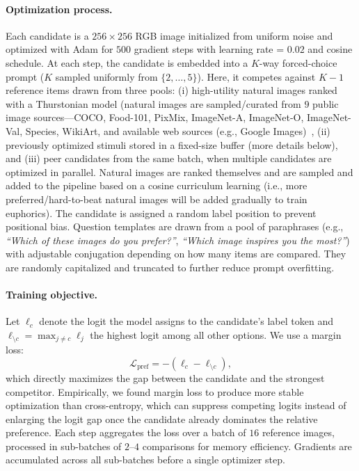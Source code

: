 \paragraph{Optimization process.}
Each candidate is a $256 \times 256$ RGB image initialized from uniform noise and optimized with Adam for $500$ gradient steps with learning rate = $0.02$ and cosine schedule. At each step, the candidate is embedded into a $K$-way forced-choice prompt ($K$ sampled uniformly from $\{2,\ldots,5\}$). Here, it competes against $K{-}1$ reference items drawn from three pools: (i) high-utility natural images ranked with a Thurstonian model (natural images are sampled/curated from $9$ public image sources---COCO, Food-101, PixMix, ImageNet-A, ImageNet-O, ImageNet-Val, Species, WikiArt, and available web sources (e.g., Google Images)~\citep{lin2014coco,bossard14,hendrycks2022pixmixdreamlikepicturescomprehensively,hendrycks2021nae,5206848,he2023species196,wikiart}, (ii) previously optimized stimuli stored in a fixed-size buffer (more details below), and (iii) peer candidates from the same batch, when multiple candidates are optimized in parallel. Natural images are ranked themselves and are sampled and added to the pipeline based on a cosine curriculum learning (i.e., more preferred/hard-to-beat natural images will be added gradually to train euphorics). The candidate is assigned a random label position to prevent positional bias. Question templates are drawn from a pool of paraphrases (e.g., \textit{``Which of these images do you prefer?''}, \textit{``Which image inspires you the most?''}) with adjustable conjugation depending on how many items are compared. They are randomly capitalized and truncated to further reduce prompt overfitting.

\paragraph{Training objective.}
Let $\ell_c$ denote the logit the model assigns to the candidate's label token and $\ell_{\setminus c} = \max_{j \neq c} \ell_j$ the highest logit among all other options.
We use a margin loss:
\begin{equation}
  \mathcal{L}_{\mathrm{pref}} = -(\ell_c - \ell_{\setminus c}),
\end{equation}
which directly maximizes the gap between the candidate and the strongest competitor.
Empirically, we found margin loss to produce more stable optimization than cross-entropy, which can suppress competing logits instead of enlarging the logit gap once the candidate already dominates the relative preference. Each step aggregates the loss over a batch of $16$ reference images, processed in sub-batches of $2$--$4$ comparisons for memory efficiency.
Gradients are accumulated across all sub-batches before a single optimizer step.

